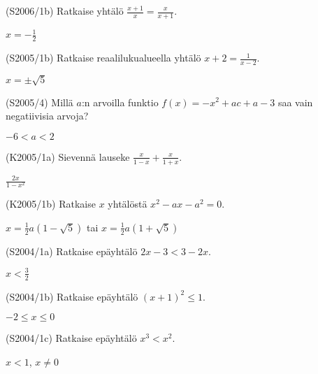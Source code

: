 \begin{tehtava}
(S2006/1b) Ratkaise yhtälö $ \frac{x+1}{x}=\frac{x}{x+1}$.
\begin{vastaus}
$x=-\frac{1}{2}$ 
\end{vastaus}
\end{tehtava}

\begin{tehtava}
(S2005/1b) Ratkaise reaalilukualueella yhtälö $x+2=\frac{1}{x-2}$.
\begin{vastaus}
$x=\pm \sqrt{5}$ 
\end{vastaus}
\end{tehtava}

\begin{tehtava}
(S2005/4) Millä $a$:n arvoilla funktio $f(x)=-x^2+ac+a-3$ saa vain negatiivisia arvoja?
\begin{vastaus}
$-6<a<2$ 
\end{vastaus}
\end{tehtava}

\begin{tehtava}
(K2005/1a) Sievennä lauseke $\frac{x}{1-x}+\frac{x}{1+x}$.
\begin{vastaus}
$\frac{2x}{1-x^2}$ 
\end{vastaus}
\end{tehtava}

\begin{tehtava}
(K2005/1b) Ratkaise $x$ yhtälöstä $x^2-ax-a^2=0$.
\begin{vastaus}
$x= \frac{1}{2}a(1-\sqrt{5})$ tai $x= \frac{1}{2}a(1+\sqrt{5})$ 
\end{vastaus}
\end{tehtava}

\begin{tehtava}
(S2004/1a) Ratkaise epäyhtälö $2x-3<3-2x$.
\begin{vastaus}
$x<\frac{3}{2}$ 
\end{vastaus}
\end{tehtava}

\begin{tehtava}
(S2004/1b) Ratkaise epäyhtälö $(x+1)^2 \leq 1$.
\begin{vastaus}
$-2 \leq x \leq 0$ 
\end{vastaus}
\end{tehtava}

\begin{tehtava}
(S2004/1c) Ratkaise epäyhtälö $x^3<x^2$.
\begin{vastaus}
$x<1$, $x\neq0$ 
\end{vastaus}
\end{tehtava}

